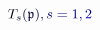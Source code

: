 \documentclass[12pt]{article}
\begin{document}
\makeatletter
\renewcommand*{\@textcolor}[3]{%
  \protect\leavevmode
  \begingroup
    \color#1{#2}#3%
  \endgroup
}
\makeatother
\begin{displaymath}
\mathcolor[RGB]{0,0,15}{T} _ { \mathcolor[RGB]{0,0,30}{s} } \mathcolor[RGB]{0,0,45}{(} \mathfrak { \mathcolor[RGB]{0,0,60}{p} } \mathcolor[RGB]{0,0,75}{)} \mathcolor[RGB]{0,0,90}{,} \mathcolor[RGB]{0,0,105}{s} \mathcolor[RGB]{0,0,120}{=} \mathcolor[RGB]{0,0,135}{1} \mathcolor[RGB]{0,0,150}{,} \mathcolor[RGB]{0,0,165}{2}
\end{displaymath}
\end{document}
